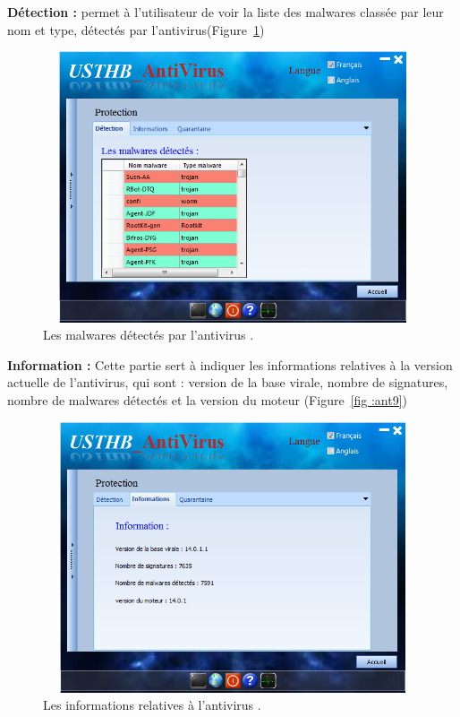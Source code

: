 \begin{list}{•}{}
\item \textbf{Détection : } permet à l'utilisateur de voir la liste des malwares classée par leur nom et type, détectés par l'antivirus(Figure~\ref{fig :ant8})
\begin{figure}[H]
\begin{center}
\includegraphics[width=13cm, height=8cm]{Figures/ant8.png}
\caption{Les malwares détectés par l'antivirus .}
\label{fig :ant8} 
\end{center}
\end{figure}
\item \textbf{Information : }Cette partie sert à indiquer les informations relatives à la version actuelle de l'antivirus, qui sont : version de la base virale, nombre de signatures, nombre de malwares détectés et la version du moteur (Figure~\ref{fig :ant9})
\begin{figure}[H]
\begin{center}
\includegraphics[width=13cm, height=8cm]{Figures/ant9.png}
\caption{Les informations relatives à l'antivirus .}

\end{center}
\end{figure}
\end{list}
